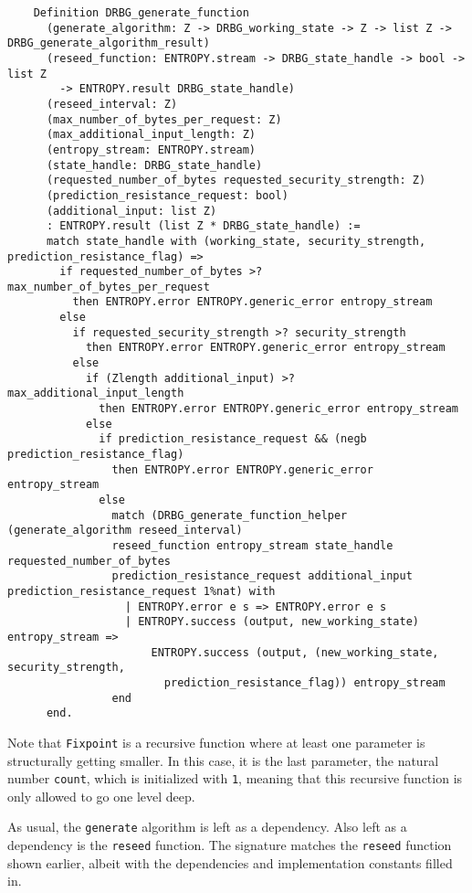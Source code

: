 \documentclass[pageno]{jpaper}
\begin{document}
\begin{lstlisting}
    Definition DRBG_generate_function
      (generate_algorithm: Z -> DRBG_working_state -> Z -> list Z -> DRBG_generate_algorithm_result)
      (reseed_function: ENTROPY.stream -> DRBG_state_handle -> bool -> list Z
        -> ENTROPY.result DRBG_state_handle)
      (reseed_interval: Z)
      (max_number_of_bytes_per_request: Z)
      (max_additional_input_length: Z)
      (entropy_stream: ENTROPY.stream)
      (state_handle: DRBG_state_handle)
      (requested_number_of_bytes requested_security_strength: Z)
      (prediction_resistance_request: bool)
      (additional_input: list Z)
      : ENTROPY.result (list Z * DRBG_state_handle) :=
      match state_handle with (working_state, security_strength, prediction_resistance_flag) =>
        if requested_number_of_bytes >? max_number_of_bytes_per_request
          then ENTROPY.error ENTROPY.generic_error entropy_stream
        else
          if requested_security_strength >? security_strength
            then ENTROPY.error ENTROPY.generic_error entropy_stream
          else
            if (Zlength additional_input) >? max_additional_input_length
              then ENTROPY.error ENTROPY.generic_error entropy_stream
            else
              if prediction_resistance_request && (negb prediction_resistance_flag)
                then ENTROPY.error ENTROPY.generic_error entropy_stream
              else
                match (DRBG_generate_function_helper (generate_algorithm reseed_interval)
                reseed_function entropy_stream state_handle requested_number_of_bytes
                prediction_resistance_request additional_input prediction_resistance_request 1%nat) with
                  | ENTROPY.error e s => ENTROPY.error e s
                  | ENTROPY.success (output, new_working_state) entropy_stream =>
                      ENTROPY.success (output, (new_working_state, security_strength,
                        prediction_resistance_flag)) entropy_stream
                end
      end.
\end{lstlisting}


Note that \lstinline{Fixpoint} is a recursive function where at least one parameter is structurally getting smaller. In this case, it is the last parameter, the natural number \lstinline{count}, which is initialized with \lstinline{1}, meaning that this recursive function is only allowed to go one level deep.

As usual, the \lstinline{generate} algorithm is left as a dependency. Also left as a dependency is the \lstinline{reseed} function. The signature matches the \lstinline{reseed} function shown earlier, albeit with the dependencies and implementation constants filled in.
\end{document}
